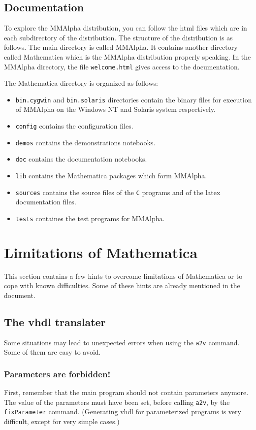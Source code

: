 \documentclass[12pt]{article}
\newcommand{\C}{\texttt{C}}
\newcommand{\MMA}{{\sc MMAlpha}}
\newcommand{\vhdl}{{\sc vhdl}}
\newcommand{\MMAlfa}{\MMA}
\newcommand{\mma}{{Mathematica}}
\begin{document}
\subsection{Documentation}
To explore the \MMAlfa{} distribution, you can follow the 
html files which are in each subdirectory of the distribution.
The structure of 
the distribution is as follows. The main directory is called \MMAlfa{}. It
contains another directory called Mathematica which is the 
\MMAlfa{} distribution properly speaking. In the \MMAlfa{} directory, 
the file \texttt{welcome.html} gives access to the documentation. 

The Mathematica directory is organized as follows:
\begin{itemize}
\item \texttt{bin.cygwin} and \texttt{bin.solaris} 
directories contain the binary files for execution of \MMAlfa{} on 
the Windows NT and Solaris system respectively. 
\item \texttt{config} contains the configuration files.
\item \texttt{demos} contains the demonstrations notebooks.
\item \texttt{doc} contains the documentation notebooks.
\item \texttt{lib} contains the Mathematica packages which form 
\MMAlfa{}.
\item \texttt{sources} contains the source files of the \C{} programs
and of the latex documentation files. 
\item \texttt{tests} containes the test programs for \MMAlfa{}.
\end{itemize}

\section{Limitations of \mma{}}
This section contains a few hints to overcome limitations of \mma{} or
to cope with known difficulties. Some of these hints are already mentioned in the
document.

\subsection{The \vhdl{} translater}
Some situations may lead to unexpected errors when using the \texttt{a2v} 
command. Some of them are easy to avoid.

\subsubsection*{Parameters are forbidden!}
First, remember that the main program should not contain parameters anymore. 
The value of the parameters must have been set, before calling \texttt{a2v}, by the \texttt{fixParameter} 
command. (Generating \vhdl{} for parameterized programs is very difficult, except for very simple
cases.)
\end{document}
